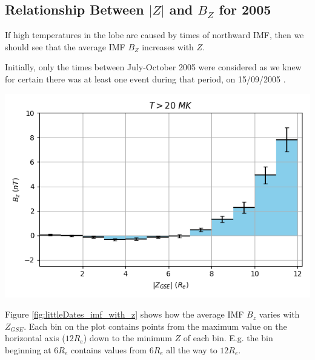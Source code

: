 \documentclass[12pt]{article}
\newenvironment{Figure}
  {\par\medskip\noindent\minipage{\linewidth}}
  {\endminipage\par\medskip}
\begin{document}
\subsection{Relationship Between $|Z|$ and $B_Z$ for 2005}
If high temperatures in the lobe are caused by times of northward IMF, then we should see that the average IMF $B_Z$ increases with $Z$. 

Initially, only the times between July-October 2005 were considered as we knew for certain there was at least one event during that period, on 15/09/2005 \cite{Fear1506}.

\begin{Figure}
    \begin{minipage}[c]{0.57\textwidth}
        \centering
        \includegraphics[width=\textwidth]{littleDates_imf_with_z.png}
    \end{minipage}
    \begin{minipage}[c]{0.4\textwidth}
        \label{fig:littleDates_imf_with_z}
    \end{minipage}
\end{Figure}

Figure \ref{fig:littleDates_imf_with_z} shows how the average IMF $B_z$ varies with $Z_{GSE}$. Each bin on the plot contains points from the maximum value on the horizontal axis ($12R_e$) down to the minimum $Z$ of each bin. E.g. the bin beginning at $6R_e$ contains values from $6R_e$ all the way to $12R_e$.
\end{document}

